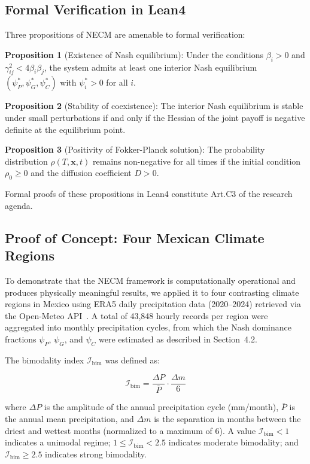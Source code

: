 \documentclass[12pt,a4paper]{article}
\begin{document}
\subsection{Formal Verification in Lean4}

Three propositions of NECM are amenable to formal verification:

\textbf{Proposition 1} (Existence of Nash equilibrium): Under the
conditions $\beta_i > 0$ and $\gamma_{ij}^2 < 4\beta_i\beta_j$,
the system admits at least one interior Nash equilibrium
$(\psi_P^*, \psi_G^*, \psi_C^*)$ with $\psi_i^* > 0$ for all $i$.

\textbf{Proposition 2} (Stability of coexistence): The interior Nash
equilibrium is stable under small perturbations if and only if the
Hessian of the joint payoff is negative definite at the equilibrium
point.

\textbf{Proposition 3} (Positivity of Fokker-Planck solution): The
probability distribution $\rho(T,\mathbf{x},t)$ remains non-negative
for all times if the initial condition $\rho_0 \geq 0$ and the
diffusion coefficient $D > 0$.

Formal proofs of these propositions in Lean4 constitute Art.C3 of the
research agenda.



\subsection{Proof of Concept: Four Mexican Climate Regions}

To demonstrate that the NECM framework is computationally operational
and produces physically meaningful results, we applied it to four
contrasting climate regions in Mexico using ERA5 daily precipitation
data (2020--2024) retrieved via the Open-Meteo API~\citep{Hersbach2020}.
A total of 43,848 hourly records per region were aggregated into monthly
precipitation cycles, from which the Nash dominance fractions
$\psi_P$, $\psi_G$, and $\psi_C$ were estimated as described in
Section~4.2.

The bimodality index $\mathcal{I}_\mathrm{bim}$ was defined as:

\begin{equation}
\mathcal{I}_\mathrm{bim} = \frac{\Delta P}{\bar{P}} \cdot \frac{\Delta m}{6}
\end{equation}

where $\Delta P$ is the amplitude of the annual precipitation cycle
(mm/month), $\bar{P}$ is the annual mean precipitation, and $\Delta m$
is the separation in months between the driest and wettest months
(normalized to a maximum of 6). A value $\mathcal{I}_\mathrm{bim} < 1$
indicates a unimodal regime; $1 \leq \mathcal{I}_\mathrm{bim} < 2.5$
indicates moderate bimodality; and $\mathcal{I}_\mathrm{bim} \geq 2.5$
indicates strong bimodality.
\end{document}
